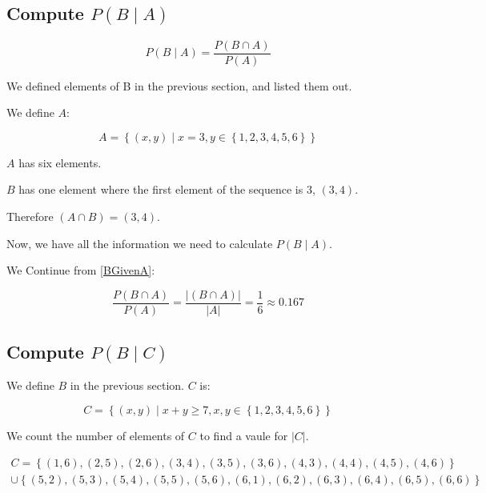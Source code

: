 \documentclass[a4paper,11pt]{article}
\begin{document}
\label{defs}
\subsection{Compute $P \left( B \mid A \right)$} 

\begin{equation}  
  P \left( B \mid A \right) =
  \frac {P \left( B \cap A \right) } { P \left( A \right) }
\end{equation}

We defined elements of B in the previous section, and listed them out.

We define $A$:

\begin{equation} \label{BGivenA}
  A = \left\{ \left(x, y \right) \mid x = 3, y \in 
    \left\{ 1, 2, 3, 4, 5, 6 \right\} \right\}
\end{equation}

$A$ has six elements.

$B$ has one element where the first element of the sequence is $3$,
$\left(3, 4 \right)$.

Therefore $\left( A \cap B \right) = \left( 3,4 \right)$.{}

Now, we have all the information we need to calculate 
$P \left( B \mid A \right)$.{}

We Continue from \ref{BGivenA}:

\begin{equation}  
  \frac {P \left( B \cap A \right) } { P \left( A \right) } =
  \frac {\left| \left( B \cap A \right) \right|}
    {\left| A \right|} = \frac{1}{6} \approx 0.167
\end{equation}

\subsection{Compute $P\left( B \mid C \right)$}

We define $B$ in the previous section.  $C$ is:

\begin{equation}
  C = \left\{ \left( x, y \right) \mid x + y \geq 7, x,y \in{}
    \left\{ 1, 2, 3, 4, 5, 6 \right\} \right\}
\end{equation}

We count the number of elements of $C$ to find a vaule for 
$\left| C \right|$.

\begin{multline}
  C = \left\{ \left( 1, 6 \right),
    \left( 2, 5 \right),
    \left( 2, 6 \right),
    \left( 3, 4 \right),
    \left( 3, 5 \right),
    \left( 3, 6 \right),
    \left( 4, 3 \right),
    \left( 4, 4 \right),
    \left( 4, 5 \right),
    \left( 4, 6 \right)\right\} \\ \cup \left\{ \left( 5, 2 \right),
    \left( 5, 3 \right),
    \left( 5, 4 \right),
    \left( 5, 5 \right),
    \left( 5, 6 \right),
    \left( 6, 1 \right),
    \left( 6, 2 \right),
    \left( 6, 3 \right),
    \left( 6, 4 \right),
    \left( 6, 5 \right),
    \left( 6, 6 \right) \right\}
\end{multline}
\end{document}
